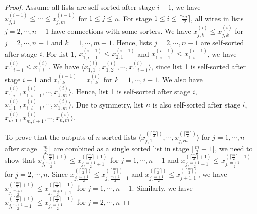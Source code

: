\documentclass[10pt,journal,cspaper,compsoc]{IEEEtran}
\begin{document}
\begin{proof}
  Assume all lists are self-sorted after stage $i-1$, we have $x^{(i-1)}_{j,1} \le \cdots \le x^{(i-1)}_{j,m}$ for $1 \le j \le n$.
  For stage $1 \le i \le \lceil \frac{m}{2} \rceil$, all wires in lists $j=2,\cdots,n-1$ have connections with some sorters.
  We have $ x^{(i)}_{j,k} \le x^{(i)}_{j,k}$ for $j=2,\cdots,n-1$ and $k=1,\cdots,m-1$. Hence, lists $j=2,\cdots,n-1$ are self-sorted after stage $i$.
  For list 1, $x^{(i-1)}_{1,i-1} \le x^{(i-1)}_{2,1}$ and $x^{(i-1)}_{1,i-1} \le x^{(i-1)}_{1,i}$, we have $x^{(i)}_{1,i-1} \le x^{(i)}_{1,i}$. We have $\langle x^{(i)}_{1,1}, x^{(i)}_{1,2},\cdots, x^{(i)}_{1,i-1} \rangle$, since list 1 is self-sorted after stage $i-1$ and $x^{(i-1)}_{1,k} = x^{(i)}_{1,k}$ for $k=1,\cdots,i-1$. We also have $x^{(i)}_{1,i}, x^{(i)}_{1,i+1}, \cdots, x^{(i)}_{1,m} \rangle$. Hence, list 1 is self-sorted after stage $i$, $x^{(i)}_{1,1}, x^{(i)}_{1,i+1}, \cdots, x^{(i)}_{1,m} \rangle$. Due to symmetry, list $n$ is also self-sorted after stage $i$, $x^{(i)}_{m,1}, x^{(i)}_{m,i+1}, \cdots, x^{(i)}_{n,m} \rangle$.



  To prove that the outputs of $n$ sorted lists $\langle x^{(\lceil \frac{m}{2} \rceil)}_{j,1}, \cdots, x^{(\lceil \frac{m}{2} \rceil)}_{j,m} \rangle$ for $j=1,\cdots,n$ after stage $\lceil \frac{m}{2} \rceil$ are combined as a single sorted list in stage $\lceil \frac{m}{2} + 1 \rceil$, we need to show that $x^{(\lceil \frac{m}{2} \rceil + 1)}_{j,\frac{m+1}{2}} \le x^{(\lceil \frac{m}{2} \rceil + 1)}_{j,\frac{m+1}{2}+1}$ for $j=1,\cdots,n-1$ and $x^{(\lceil \frac{m}{2} \rceil + 1)}_{j,\frac{m+1}{2}-1} \le x^{(\lceil \frac{m}{2} \rceil + 1)}_{j,\frac{m+1}{2}}$ for $j=2,\cdots,n$. Since $x^{(\lceil \frac{m}{2} \rceil)}_{j,\frac{m+1}{2}} \le x^{(\lceil \frac{m}{2} \rceil)}_{j,\frac{m+1}{2}+1}$ and $x^{(\lceil \frac{m}{2} \rceil)}_{j,\frac{m+1}{2}} \le x^{(\lceil \frac{m}{2} \rceil)}_{j+1,1}$, we have $x^{(\lceil \frac{m}{2} \rceil + 1)}_{j,\frac{m+1}{2}} \le x^{(\lceil \frac{m}{2} \rceil+1)}_{j,\frac{m+1}{2}+1}$ for $j=1,\cdots,n-1$. Similarly, we have $x^{(\lceil \frac{m}{2} \rceil + 1)}_{j,\frac{m+1}{2}-1} \le x^{(\lceil \frac{m}{2} \rceil+1)}_{j,\frac{m+1}{2}}$ for $j=2,\cdots,n$
\end{proof}
\end{document}
